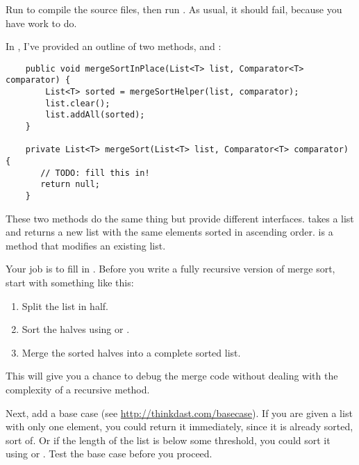 \documentclass[12pt]{book}
\theoremstyle{exercise}
\begin{document}
Run  to compile the source files, then run
. As usual, it should
fail, because you have work to do.


In , I've provided an outline of two methods,
 and :

\begin{verbatim}
    public void mergeSortInPlace(List<T> list, Comparator<T> comparator) {
        List<T> sorted = mergeSortHelper(list, comparator);
        list.clear();
        list.addAll(sorted);
    }

    private List<T> mergeSort(List<T> list, Comparator<T> comparator) {
       // TODO: fill this in!
       return null;
    }
\end{verbatim}

These two methods do the same thing but provide different interfaces.
 takes a list and returns a new list with the same
elements sorted in ascending order.  is a
 method that modifies an existing list.


Your job is to fill in . Before you write a fully
recursive version of merge sort, start with something like this:

\begin{enumerate}

\item
  Split the list in half.

\item
  Sort the halves using  or
  .

\item
  Merge the sorted halves into a complete sorted list.

\end{enumerate}

This will give you a chance to debug the merge code without dealing with
the complexity of a recursive method.


Next, add a base case (see
\url{http://thinkdast.com/basecase}). If you are
given a list with only one element, you could return it immediately,
since it is already sorted, sort of. Or if the length of the list is
below some threshold, you could sort it using 
or . Test the base case before you proceed.
\end{document}
